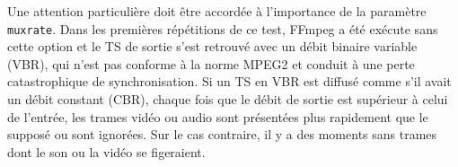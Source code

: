 \documentclass[12pt,a4paper]{article}
\begin{document}



Une attention particulière doit être accordée à l'importance de la paramètre \texttt{muxrate}. Dans les premières répétitions de ce test, FFmpeg a été exécute sans cette option et le TS de sortie s'est retrouvé avec un débit binaire variable (VBR), qui n'est pas conforme à la norme MPEG2 et conduit à une perte catastrophique de synchronisation. Si un TS en VBR est diffusé comme s'il avait un débit constant (CBR), chaque fois que le débit de sortie est supérieur à celui de l'entrée, les trames vidéo ou audio sont présentées plus rapidement que le supposé ou sont ignorées. Sur le cas contraire, il y a des moments sans trames dont le son ou la vidéo se figeraient.

\end{document}

